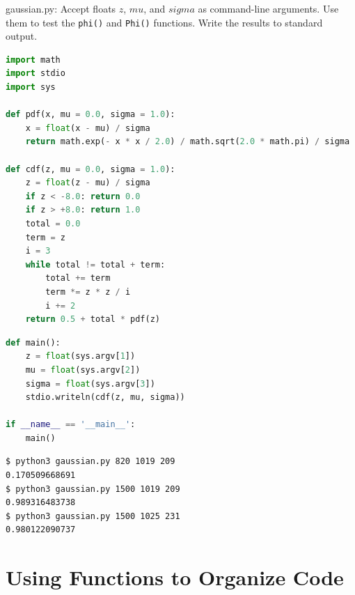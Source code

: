 \documentclass[8pt,a4paper,compress]{beamer}
\begin{document}
\begin{frame}[fragile]
\pause

\begin{framed}
\tiny gaussian.py: Accept floats $z$, $mu$, and $sigma$ as command-line arguments. Use them to test the \lstinline{phi()} and \lstinline{Phi()} functions. Write the results to standard output.
\end{framed}

\begin{lstlisting}[language=Python]
import math
import stdio
import sys

def pdf(x, mu = 0.0, sigma = 1.0):
    x = float(x - mu) / sigma
    return math.exp(- x * x / 2.0) / math.sqrt(2.0 * math.pi) / sigma

def cdf(z, mu = 0.0, sigma = 1.0):
    z = float(z - mu) / sigma
    if z < -8.0: return 0.0
    if z > +8.0: return 1.0
    total = 0.0
    term = z
    i = 3
    while total != total + term:
        total += term
        term *= z * z / i
        i += 2
    return 0.5 + total * pdf(z)
\end{lstlisting}
\end{frame}

\begin{frame}[fragile]
\pause

\begin{lstlisting}[language=Python]
def main():
    z = float(sys.argv[1])
    mu = float(sys.argv[2])
    sigma = float(sys.argv[3])
    stdio.writeln(cdf(z, mu, sigma))

if __name__ == '__main__':
    main()
\end{lstlisting}

\pause

\begin{lstlisting}[language={}]
$ python3 gaussian.py 820 1019 209
0.170509668691
$ python3 gaussian.py 1500 1019 209
0.989316483738
$ python3 gaussian.py 1500 1025 231
0.980122090737
\end{lstlisting}
\end{frame}

\section{Using Functions to Organize Code}
\end{document}
